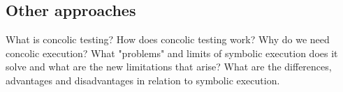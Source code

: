 \subsection{Other approaches}
\cite{SurveySymExec-CSUR18}

What is concolic testing? How does concolic testing work? Why do we need concolic execution? What "problems" and limits of symbolic execution does it solve and what are the new limitations that arise?
What are the differences, advantages and disadvantages in relation to symbolic execution.
\cite{Cadar:2006:EAG:1180405.1180445}
\cite{Cadar:2008:KUA:1855741.1855756}
\cite{Cadar:2013:SES:2408776.2408795}
\cite{Godefroid:2005:DDA:1064978.1065036}
\cite{Godefroid:2012:SWF:2090147.2094081}